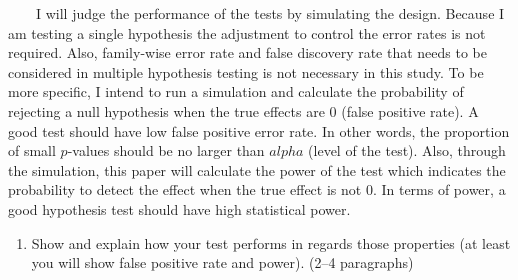 \documentclass[
  11pt,
]{article}
\providecommand{\tightlist}{%
  \setlength{\itemsep}{0pt}\setlength{\parskip}{0pt}}
\begin{document}
~~~~I will judge the performance of the tests by simulating the design.
Because I am testing a single hypothesis the adjustment to control the
error rates is not required. Also, family-wise error rate and false
discovery rate that needs to be considered in multiple hypothesis
testing is not necessary in this study. To be more specific, I intend to
run a simulation and calculate the probability of rejecting a null
hypothesis when the true effects are 0 (false positive rate). A good
test should have low false positive error rate. In other words, the
proportion of small \(p\)-values should be no larger than \(alpha\)
(level of the test). Also, through the simulation, this paper will
calculate the power of the test which indicates the probability to
detect the effect when the true effect is not 0. In terms of power, a
good hypothesis test should have high statistical power.

\begin{enumerate}
\def\labelenumi{\arabic{enumi}.}
\setcounter{enumi}{9}
\tightlist
\item
  Show and explain how your test performs in regards those properties
  (at least you will show false positive rate and power). (2--4
  paragraphs)
\end{enumerate}
\end{document}

